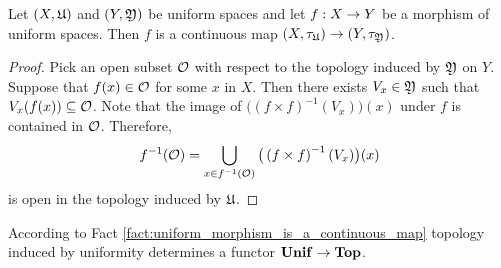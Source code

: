 \begin{fact}\label{fact:uniform_morphism_is_a_continuous_map}
Let $(X,{\mathfrak U})$ and $(Y,{\mathfrak Y})$ be uniform spaces and let $f:X\rightarrow Y$ be a morphism of uniform spaces. Then $f$ is a continuous map $\left(X,\tau_{{\mathfrak U}}\right)\rightarrow \left(Y,\tau_{{\mathfrak Y}}\right)$.
\end{fact}
\begin{proof}
Pick an open subset ${\mathcal O}$ with respect to the topology induced by ${\mathfrak Y}$ on $Y$. Suppose that $f(x) \in {\mathcal O}$ for some $x$ in $X$. Then there exists $V_x \in {\mathfrak Y}$ such that $V_x(f(x))\subseteq {\mathcal O}$. Note that the image of $\big(\left(f\times f\right)^{-1}(V_x)\big)(x)$ under $f$ is contained in ${\mathcal O}$. Therefore,
$$f^{-1}({\mathcal O}) = \bigcup_{x\in f^{-1}({\mathcal O})}\big(\left(f\times f\right)^{-1}(V_x)\big)(x)$$
is open in the topology induced by ${\mathfrak U}$.
\end{proof}

\begin{remark}\label{remark:functor_of_topology_induced_by_uniform_structure}
According to Fact \ref{fact:uniform_morphism_is_a_continuous_map} topology induced by uniformity determines a functor $\mathbf{Unif} \rightarrow \mathbf{Top}$.
\end{remark}

